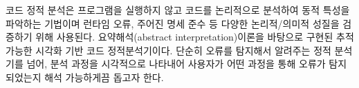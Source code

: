 
\begin{titlepage}
\thispagestyle{empty}

\centering

\vspace{1cm}

\begin{minipage}{0.9\textwidth}
    \hspace*{1em}
    코드 정적 분석은 프로그램을 실행하지 않고 코드를 논리적으로 분석하여 동적 특성을 파악하는
기법이며 런타임 오류, 주어진 명세 준수 등 다양한 논리적/의미적 성질을 검증하기 위해 사용된다.
 요약해석(abstract interpretation)이론을 바탕으로 구현된 추적 가능한 시각화 기반 코드 정적분석기이다.
단순히 오류를 탐지해서 알려주는 정적 분석기를 넘어, 분석 과정을 시각적으로
나타내어 사용자가 어떤 과정을 통해 오류가 탐지되었는지 해석 가능하게끔 돕고자 한다.
\end{minipage} \par

\end{titlepage}